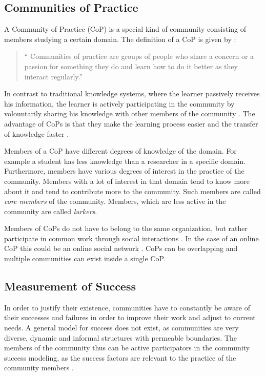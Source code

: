 \subsection{Communities of Practice}
A Community of Practice (CoP) is a special kind of community consisting of members studying a certain domain.
The definition of a CoP is given by \cite{Weng98}:
\begin{quote}
    ``
    Communities of practice are groups of people who share a concern or a passion for something they do and learn how to do it better as they interact regularly.''
\end{quote}

In contrast to traditional knowledge systems, where the learner passively receives his information, the learner is actively participating in the community by volountarily sharing his knowledge with other members of the community \cite{AMMi15,Kern08}.
The advantage of CoPs is that they make the learning process easier \cite{SaAr05} and the transfer of knowledge faster \cite{CuZe05}.

Members of a CoP have different degrees of knowledge of the domain.
For example a student has less knowledge than a researcher in a specific domain.
Furthermore, members have various degrees of interest in the practice of the community.
Members with a lot of interest in that domain tend to know more about it and tend to contribute more to the community.
Such members are called \emph{core members} of the community.
Members, which are less active in the community are called \emph{lurkers}.

Members of CoPs do not have to belong to the same organization, but rather participate in common work through social interactions \cite{Weng98}. In the case of an online CoP this could be an online social network \cite{CuZe05}. CoPs can be overlapping and multiple communities can exist inside a single CoP.

\subsection{Measurement of Success}
In order to justify their existence, communities have to constantly be aware of their successes and failures in order to improve their work and adjust to current needs.
A general model for success does not exist, as communities are very diverse, dynamic and informal structures with permeable boundaries.
The members of the community thus can be active participators in the community success modeling, as the success factors are relevant to the practice of the community members \cite{RKJa15}.

